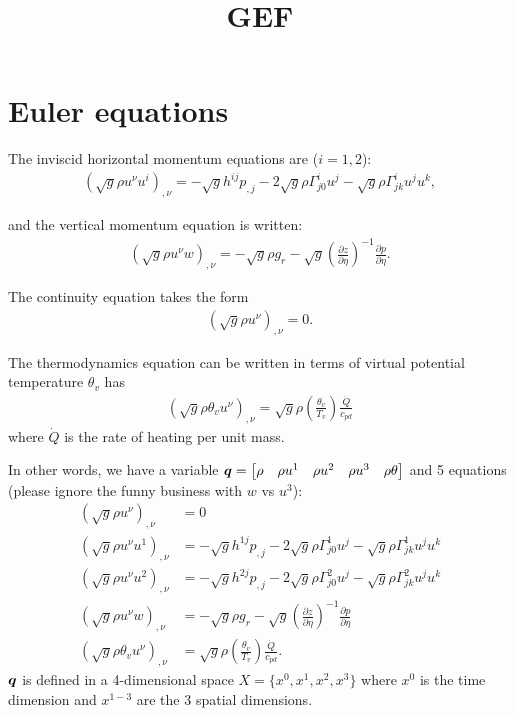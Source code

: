 \documentclass{article}
\title{GEF}
\begin{document}
\maketitle

\section{Euler equations}

The inviscid horizontal momentum equations are ($i=1,2$):
\begin{align}
\left( \sqrt{g}\rho u^\nu u^i\right)_{,\nu} = - \sqrt{g}h^{ij}p_{,j} -2\sqrt{g} \rho \Gamma^i_{j0} u^j - \sqrt{g} \rho \Gamma^i_{jk}u^ju^k,
\end{align}

and the vertical momentum equation is written:
\begin{align}
\left(\sqrt{g}\rho u^\nu w\right)_{,\nu}=-\sqrt{g}\rho g_r-\sqrt{g} \left(\frac{\partial z}{\partial \eta}\right)^{-1} \frac{\partial p}{\partial\eta}.
\end{align}

The continuity equation takes the form
\begin{align}
\left( \sqrt{g}\rho u^\nu \right)_{,\nu} = 0.
\end{align}

The thermodynamics equation can be written in terms of virtual potential temperature $\theta_v$ has
\begin{align}
   \left( \sqrt{g}\rho \theta_v u^\nu \right)_{,\nu} = \sqrt{g} \rho \left( \frac{\theta_v}{T_v} \right) \frac{\dot{Q}}{c_{pd}}
\end{align}
where $\dot{Q}$ is the rate of heating per unit mass.

In other words, we have a variable
$\bm{q} = \left[\begin{matrix}\rho & \rho u^1 & \rho u^2 & \rho u^3 & \rho\theta\end{matrix}\right]$
and 5 equations (please ignore the funny business with $w$ vs $u^3$):
\begin{align}
\left( \sqrt{g}\rho u^\nu \right)_{,\nu} &= 0 \\
\left( \sqrt{g}\rho u^\nu u^1\right)_{,\nu} &=
    - \sqrt{g}h^{1j}p_{,j} -2\sqrt{g} \rho \Gamma^1_{j0} u^j - \sqrt{g} \rho \Gamma^1_{jk}u^ju^k \\
\left( \sqrt{g}\rho u^\nu u^2\right)_{,\nu} &=
    - \sqrt{g}h^{2j}p_{,j} -2\sqrt{g} \rho \Gamma^2_{j0} u^j - \sqrt{g} \rho \Gamma^2_{jk}u^ju^k \\
\left(\sqrt{g}\rho u^\nu w\right)_{,\nu} &=
    -\sqrt{g}\rho g_r-\sqrt{g} \left(\frac{\partial z}{\partial \eta}\right)^{-1} \frac{\partial p}{\partial\eta} \\
\left( \sqrt{g}\rho \theta_v u^\nu \right)_{,\nu} &=
    \sqrt{g} \rho \left( \frac{\theta_v}{T_v} \right) \frac{\dot{Q}}{c_{pd}}
    \text{.}
\end{align}
$\bm{q}$ is defined in a 4-dimensional space $X = \{x^0, x^1, x^2, x^3 \} $ where $x^0$ is
the time dimension and $x^{1-3}$ are the 3 spatial dimensions.
\end{document}
